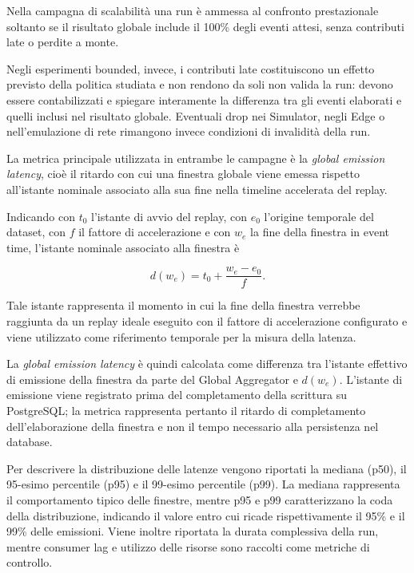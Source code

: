 Nella campagna di scalabilità una run è ammessa al confronto prestazionale
soltanto se il risultato globale include il 100\% degli eventi attesi, senza
contributi late o perdite a monte.

Negli esperimenti bounded, invece, i contributi late costituiscono un effetto
previsto della politica studiata e non rendono da soli non valida la run:
devono essere contabilizzati e spiegare interamente la differenza tra gli
eventi elaborati e quelli inclusi nel risultato globale. Eventuali drop nei
Simulator, negli Edge o nell'emulazione di rete rimangono invece condizioni
di invalidità della run.

La metrica principale utilizzata in entrambe le campagne è la
\emph{global emission latency}, cioè il ritardo con cui una finestra globale
viene emessa rispetto all'istante nominale associato alla sua fine nella
timeline accelerata del replay.

Indicando con $t_0$ l'istante di avvio del replay, con $e_0$ l'origine
temporale del dataset, con $f$ il fattore di accelerazione e con $w_e$ la fine
della finestra in event time, l'istante nominale associato alla finestra è

\begin{equation}
    d(w_e) = t_0 + \frac{w_e-e_0}{f}.
\end{equation}

Tale istante rappresenta il momento in cui la fine della finestra verrebbe
raggiunta da un replay ideale eseguito con il fattore di accelerazione
configurato e viene utilizzato come riferimento temporale per la misura della
latenza.

La \emph{global emission latency} è quindi calcolata come differenza tra
l'istante effettivo di emissione della finestra da parte del Global Aggregator
e $d(w_e)$. L'istante di emissione viene registrato prima del completamento
della scrittura su PostgreSQL; la metrica rappresenta pertanto il ritardo di
completamento dell'elaborazione della finestra e non il tempo necessario alla
persistenza nel database.

Per descrivere la distribuzione delle latenze vengono riportati la mediana
(p50), il 95-esimo percentile (p95) e il 99-esimo percentile (p99). La mediana
rappresenta il comportamento tipico delle finestre, mentre p95 e p99
caratterizzano la coda della distribuzione, indicando il valore entro cui
ricade rispettivamente il 95\% e il 99\% delle emissioni. Viene inoltre
riportata la durata complessiva della run, mentre consumer lag e utilizzo delle
risorse sono raccolti come metriche di controllo.

